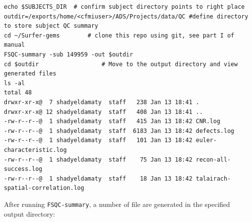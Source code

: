 \documentclass[paper=a4, fontsize=11pt]{scrartcl} %
\numberwithin{equation}{section} %
\numberwithin{figure}{section} %
\numberwithin{table}{section} %
\begin{document}
\begin{lstlisting}
echo $SUBJECTS_DIR 	# confirm subject directory points to right place
outdir=/exports/home/<cfmiuser>/ADS/Projects/data/QC #define directory to store subject QC summary
cd ~/Surfer-gems		# clone this repo using git, see part I of manual
FSQC-summary -sub 149959 -out $outdir
cd $outdir 					# Move to the output directory and view generated files
ls -al
total 48
drwxr-xr-x@  7 shadyeldamaty  staff   238 Jan 13 18:41 .
drwxr-xr-x@ 12 shadyeldamaty  staff   408 Jan 13 18:41 ..
-rw-r--r--@  1 shadyeldamaty  staff   415 Jan 13 18:42 CNR.log
-rw-r--r--@  1 shadyeldamaty  staff  6183 Jan 13 18:42 defects.log
-rw-r--r--@  1 shadyeldamaty  staff   101 Jan 13 18:42 euler-characteristic.log
-rw-r--r--@  1 shadyeldamaty  staff    75 Jan 13 18:42 recon-all-success.log
-rw-r--r--@  1 shadyeldamaty  staff    18 Jan 13 18:42 talairach-spatial-correlation.log
\end{lstlisting}

After running \texttt{FSQC-summary}, a number of file are generated in the specified output directory:
\end{document}
